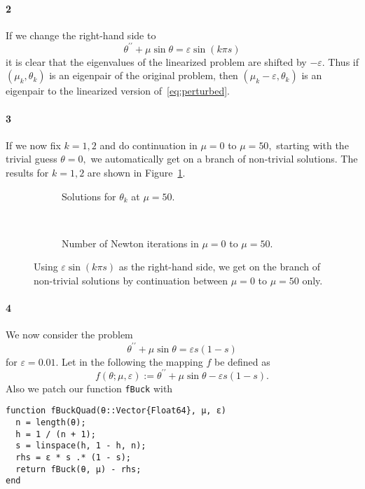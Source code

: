 \documentclass[a4paper]{article}
\begin{document}
  \paragraph{2} If we change the right-hand side to
  \begin{equation}\label{eq:perturbed}
    \theta^{\prime\prime} + \mu \sin \theta = \varepsilon \sin(k\pi s)
  \end{equation}
  it is clear that the eigenvalues of the linearized problem are shifted by $-\varepsilon$. Thus if $(\mu_k, \theta_k)$ is an eigenpair of the original problem, then $(\mu_k - \varepsilon, \theta_k)$ is an eigenpair to the linearized version of~\eqref{eq:perturbed}.

  \paragraph{3} If we now fix $k = 1, 2$ and do continuation in $\mu = 0$ to $\mu = 50,$ starting with the trivial guess $\theta = 0,$ we automatically get on a branch of non-trivial solutions. The results for $k = 1, 2$ are shown in Figure~\ref{fig:ex4.3}.

  \begin{figure}[h]
    \begin{subfigure}[t]{0.5\textwidth}
      
      \caption{Solutions for $\theta_k$ at $\mu = 50.$}
    \end{subfigure}~
    \begin{subfigure}[t]{0.5\textwidth}
      
      \caption{Number of Newton iterations in $\mu = 0$ to $\mu = 50.$}
    \end{subfigure}
    \caption{Using $\varepsilon \sin(k \pi s)$ as the right-hand side, we get on the branch of non-trivial solutions by continuation between $\mu = 0$ to $\mu = 50$ only.}
    \label{fig:ex4.3}
  \end{figure}

  \paragraph{4} We now consider the problem
  \begin{equation}
    \theta^{\prime\prime} + \mu \sin \theta = \varepsilon s(1 - s)
  \end{equation}
  for $\varepsilon = 0.01.$ Let in the following the mapping $f$ be defined as $$f(\theta; \mu, \varepsilon) := \theta^{\prime\prime} + \mu \sin \theta - \varepsilon s(1-s).$$ Also we patch our function {\tt fBuck} with
\begin{verbatim}
function fBuckQuad(θ::Vector{Float64}, μ, ɛ)
  n = length(θ);
  h = 1 / (n + 1);
  s = linspace(h, 1 - h, n);
  rhs = ɛ * s .* (1 - s);
  return fBuck(θ, μ) - rhs;
end  
\end{verbatim}
\end{document}
